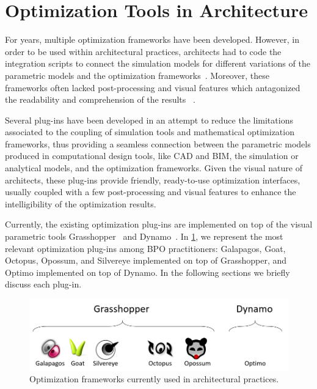 \section{Optimization Tools in Architecture}
	
	For years, multiple optimization frameworks have been developed. However, in order to be used within architectural practices, architects had to code the integration scripts to connect the simulation models for different variations of the parametric models  and the optimization frameworks~\cite{Attia2013}. Moreover, these frameworks often lacked post-processing and visual features which antagonized the readability and comprehension of the results ~\cite{Attia2013,Nguyen2014}.
	
	Several plug-ins have been developed in an attempt to reduce the limitations associated to the coupling of simulation tools and mathematical optimization frameworks, thus providing a seamless connection between the parametric models produced in computational design tools, like \ac{CAD} and \ac{BIM}, the simulation or analytical models, and the optimization frameworks. Given the visual nature of architects, these plug-ins provide friendly, ready-to-use optimization interfaces, usually coupled with a few post-processing and visual features to enhance the intelligibility of the optimization results. 
	
	Currently, the existing optimization plug-ins are implemented on top of the visual parametric tools Grasshopper~\cite{GRASSHOPPER} and Dynamo~\cite{DYNAMOBIM}. In \cref{fig:opt-plugins}, we represent the most relevant optimization plug-ins among \ac{BPO} practitioners: Galapagos, Goat, Octopus, Opossum, and Silvereye implemented on top of Grasshopper, and Optimo implemented on top of Dynamo. In the following sections we briefly discuss each plug-in.
	
\begin{figure}
\centering
\includegraphics[width=\textwidth]{Images/Background/opt-plugins.PNG}
\caption[Optimization Frameworks in the Architectural Practice]{Optimization frameworks currently used in architectural practices.}
\label{fig:opt-plugins}
\end{figure}

